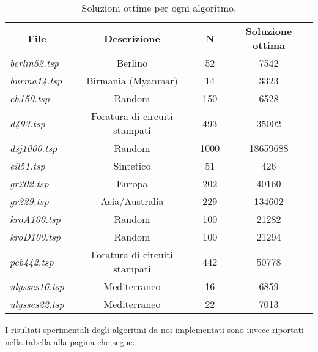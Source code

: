 \begin{table}[H]
  \centering
  \begin{tabular}{lccc}
  \multicolumn{1}{c}{\textbf{File}} & \textbf{Descrizione}          & \textbf{N} & \textbf{Soluzione ottima} \\
  \textit{berlin52.tsp}             & Berlino                       & 52         & 7542                      \\
  \textit{burma14.tsp}              & Birmania (Myanmar)            & 14         & 3323                      \\
  \textit{ch150.tsp}                & Random                        & 150        & 6528                      \\
  \textit{d493.tsp}                 & Foratura di circuiti stampati & 493        & 35002                     \\
  \textit{dsj1000.tsp}              & Random                        & 1000       & 18659688                  \\
  \textit{eil51.tsp}                & Sintetico                     & 51         & 426                       \\
  \textit{gr202.tsp}                & Europa                        & 202        & 40160                     \\
  \textit{gr229.tsp}                & Asia/Australia                & 229        & 134602                    \\
  \textit{kroA100.tsp}              & Random                        & 100        & 21282                     \\
  \textit{kroD100.tsp}              & Random                        & 100        & 21294                     \\
  \textit{pcb442.tsp}               & Foratura di circuiti stampati & 442        & 50778                     \\
  \textit{ulysses16.tsp}            & Mediterraneo                  & 16         & 6859                      \\
  \textit{ulysses22.tsp}            & Mediterraneo                  & 22         & 7013                     
  \end{tabular}
  \caption{Soluzioni ottime per ogni algoritmo.}
  \label{tab:my-table}
  \end{table}


I risultati sperimentali degli algoritmi da noi implementati sono invece riportati nella tabella alla pagina che segue.

